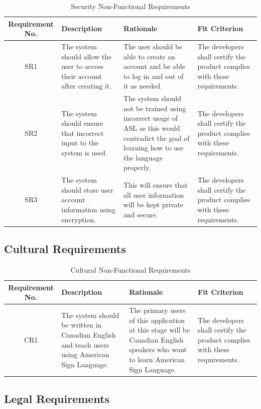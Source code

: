 \documentclass[12pt, titlepage]{article}
\begin{document}
\begin{table}[H]
\caption{Security Non-Functional Requirements}
\noindent \begin{tabular}{| c | p{3cm}| p{3cm}| p{3cm}|}
\hline 
\textbf{Requirement No.} & \textbf{Description} & \textbf{Rationale} & \textbf{Fit Criterion}\\
\hline
SR1 & The system should allow the user to access their account after creating it. & The user should be able to create an account and be able to log in and out of it as needed. & The developers shall certify the product complies with these requirements. \\
\hline
SR2 & The system should ensure that incorrect input to the system is used. & The system should not be trained using incorrect usage of ASL as this would contradict the goal of learning how to use the language properly. & The developers shall certify the product complies with these requirements. \\
\hline
SR3 & The system should store user account information using encryption. & This will ensure that all user information will be kept private and secure. & The developers shall certify the product complies with these requirements. \\
\bottomrule
\end{tabular}
\end{table}

\subsection{Cultural Requirements}

\begin{table}[H]
\caption{Cultural Non-Functional Requirements}
\noindent \begin{tabular}{| c | p{3cm}| p{3cm}| p{3cm}|}
\hline 
\textbf{Requirement No.} & \textbf{Description} & \textbf{Rationale} & \textbf{Fit Criterion}\\
\hline
CR1 & The system should be written in Canadian English and teach users using American Sign Language. & The primary users of this application at this stage will be Canadian English speakers who want to learn American Sign Language. & The developers shall certify the product complies with these requirements. \\
\bottomrule
\end{tabular}
\end{table}

\subsection{Legal Requirements}
\end{document}
